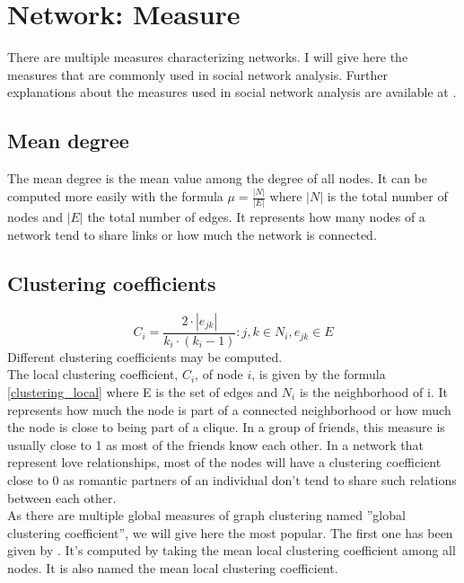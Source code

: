 \documentclass[a4paper, 12pt]{report}
\begin{document}
\section{Network: Measure}
\label{measure}
There are multiple measures characterizing networks. I will give here the measures that are commonly used in social network analysis. Further explanations about the measures used in social network analysis are available at \cite{SNA_Overview}.

\subsection{Mean degree}
The mean degree is the mean value among the degree of all nodes. It can be computed more easily with the formula $\mu = \frac{|N|}{|E|}$ where $|N|$ is the total number of nodes and $|E|$ the total number of edges. It represents how many nodes of a network tend to share links or how much the network is connected.

\subsection{Clustering coefficients}
\begin{equation}
C_i = \frac{2 \cdot |e_{jk}|}{k_i \cdot (k_i - 1)}: j, k \in N_i, e_{jk} \in E
\label{clustering_local}
\end{equation}
Different clustering coefficients may be computed.\\
The local clustering coefficient, $C_i$, of node $i$, is given by the formula \ref{clustering_local} where E is the set of edges and $N_i$ is the neighborhood of i. It represents how much the node is part of a connected neighborhood or how much the node is close to being part of a clique. In a group of friends, this measure is usually close to 1 as most of the friends know each other. In a network that represent love relationships, most of the nodes will have a clustering coefficient close to 0 as romantic partners of an individual don't tend to share such relations between each other.\\

As there are multiple global measures of graph clustering named ''global clustering coefficient'', we will give here the most popular. The first one has been given by \cite{globalClustering1}. It's computed by taking the mean local clustering coefficient among all nodes. It is also named the mean local clustering coefficient. \\
\end{document}
